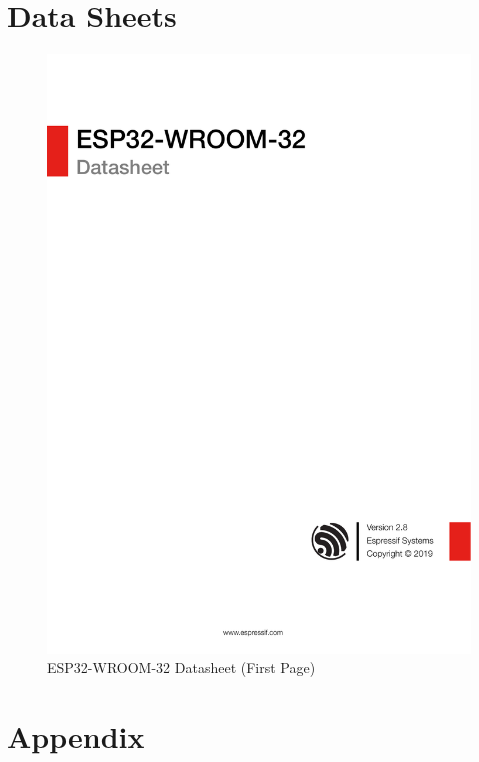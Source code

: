 \documentclass[12pt]{article}
\begin{document}
\clearpage
\section{Data Sheets}
\begin{figure}[H]
    \centering
    \includegraphics[height=0.75\textheight, frame]{esp32-wroom-32_datasheet_en.pdf}
    \caption{ESP32-WROOM-32 Datasheet (First Page)}
    \label{fig:esp-datasheet}
\end{figure}

\section{Appendix}
\end{document}
